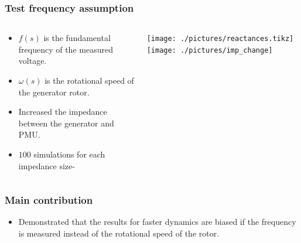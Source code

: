 \begin{frame}
	\frametitle{Test frequency assumption}
	\begin{columns}
		\begin{column}{0.3\textwidth}
			\begin{itemize}
				\item $f(s)$ is the fundamental frequency of the measured voltage.
				\item $\omega(s)$ is the rotational speed of the generator rotor.
				\item Increased the impedance between the generator and PMU.
				\item $100$ simulations for each impedance size-
			\end{itemize}
		\end{column}
		\begin{column}{0.7\textwidth}
			\texttt{[image: ./pictures/reactances.tikz]}
			\texttt{[image: ./pictures/imp\_change]}
		\end{column}
	\end{columns}
\end{frame}
\begin{frame}
	\frametitle{Main contribution}
	\begin{itemize}
		\item Demonstrated that the results for faster dynamics are biased if the frequency is measured instead of the rotational speed of the rotor.
	\end{itemize}
\end{frame}
